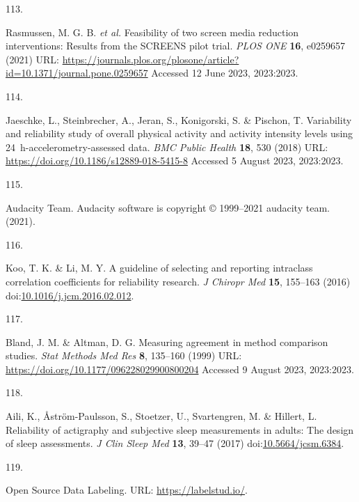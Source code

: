 \documentclass[
  10pt,
]{scrbook}
\newlength{\cslhangindent}
\newlength{\csllabelwidth}
\newlength{\cslentryspacingunit} %
\newenvironment{CSLReferences}[2] %
 {%
  \setlength{\parindent}{0pt}
  \ifodd #1
  \let\oldpar\par
  \def\par{\hangindent=\cslhangindent\oldpar}
  \fi
  \setlength{\parskip}{#2\cslentryspacingunit}
 }%
 {}
\newcommand{\CSLLeftMargin}[1]{\parbox[t]{\csllabelwidth}{#1}}
\newcommand{\CSLRightInline}[1]{\parbox[t]{\linewidth - \csllabelwidth}{#1}\break}
\begin{document}
\begin{CSLReferences}{0}{0}
\leavevmode{}%
\CSLLeftMargin{113. }%
\CSLRightInline{Rasmussen, M. G. B. \emph{et al.} Feasibility of two
screen media reduction interventions: Results from the {SCREENS} pilot
trial. \emph{{PLOS} {ONE}} \textbf{16}, e0259657 (2021) URL:
\url{https://journals.plos.org/plosone/article?id=10.1371/journal.pone.0259657}
Accessed 12 June 2023, 2023:2023.}

\leavevmode{}%
\CSLLeftMargin{114. }%
\CSLRightInline{Jaeschke, L., Steinbrecher, A., Jeran, S., Konigorski,
S. \& Pischon, T. Variability and reliability study of overall physical
activity and activity intensity levels using 24~h-accelerometry-assessed
data. \emph{{BMC} Public Health} \textbf{18}, 530 (2018) URL:
\url{https://doi.org/10.1186/s12889-018-5415-8} Accessed 5 August 2023,
2023:2023.}

\leavevmode{}%
\CSLLeftMargin{115. }%
\CSLRightInline{Audacity Team. Audacity\textregistered{} software is
copyright © 1999--2021 audacity team. (2021).}

\leavevmode{}%
\CSLLeftMargin{116. }%
\CSLRightInline{Koo, T. K. \& Li, M. Y. A guideline of selecting and
reporting intraclass correlation coefficients for reliability research.
\emph{J Chiropr Med} \textbf{15}, 155--163 (2016)
doi:\href{https://doi.org/10.1016/j.jcm.2016.02.012}{10.1016/j.jcm.2016.02.012}.}

\leavevmode{}%
\CSLLeftMargin{117. }%
\CSLRightInline{Bland, J. M. \& Altman, D. G. Measuring agreement in
method comparison studies. \emph{Stat Methods Med Res} \textbf{8},
135--160 (1999) URL: \url{https://doi.org/10.1177/096228029900800204}
Accessed 9 August 2023, 2023:2023.}

\leavevmode{}%
\CSLLeftMargin{118. }%
\CSLRightInline{Aili, K., Åström-Paulsson, S., Stoetzer, U.,
Svartengren, M. \& Hillert, L. Reliability of actigraphy and subjective
sleep measurements in adults: The design of sleep assessments. \emph{J
Clin Sleep Med} \textbf{13}, 39--47 (2017)
doi:\href{https://doi.org/10.5664/jcsm.6384}{10.5664/jcsm.6384}.}

\leavevmode{}%
\CSLLeftMargin{119. }%
\CSLRightInline{Open Source Data Labeling. URL:
\url{https://labelstud.io/}.}


\end{CSLReferences}
\end{document}
